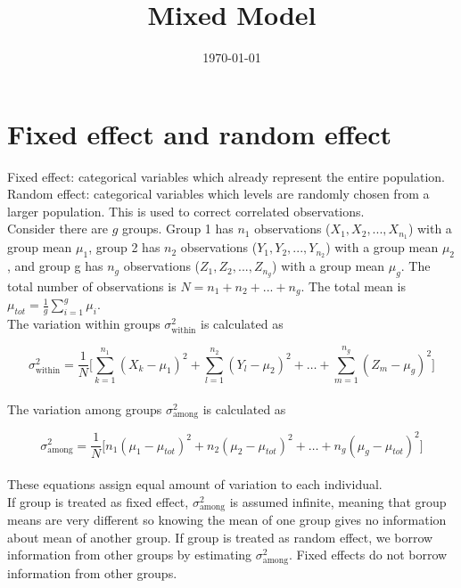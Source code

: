 \documentclass[12pt]{article}
\title{Mixed Model}
\date{\today}
\begin{document}
\maketitle

\section{Fixed effect and random effect}
Fixed effect: categorical variables which already represent the entire population. \\

Random effect: categorical variables which levels are randomly chosen from a larger population. This is used to correct correlated observations. \\

Consider there are $g$ groups. Group 1 has $n_1$ observations ($X_1, X_2, ..., X_{n_1}$) with a group mean $\mu_1$, group 2 has $n_2$ observations ($Y_1, Y_2, ..., Y_{n_2}$) with a group mean $\mu_2$, and group g has $n_g$ observations ($Z_1, Z_2, ..., Z_{n_g}$) with a group mean $\mu_g$. The total number of observations is $N = n_1 + n_2 + ... + n_g$. The total mean is $\mu_{tot}=\frac{1}{g}\sum_{i=1}^{g}\mu_i$. \\

The variation within groups $\sigma^2_{\text{within}}$ is calculated as 

$$\sigma^2_{\text{within}} = \frac{1}{N}\bigg[\sum_{k=1}^{n_1}(X_k - \mu_1)^2 + \sum_{l=1}^{n_2}(Y_l - \mu_2)^2 + \dots + \sum_{m=1}^{n_g}(Z_m - \mu_g)^2\bigg]$$\\

The variation among groups $\sigma^2_{\text{among}}$ is calculated as 

$$\sigma^2_{\text{among}} = \frac{1}{N}\bigg[n_1(\mu_1-\mu_{tot})^2 + n_2(\mu_2-\mu_{tot})^2 + \dots + n_g(\mu_g - \mu_{tot})^2\bigg]$$\\

These equations assign equal amount of variation to each individual.\\

If group is treated as fixed effect, $\sigma^2_{\text{among}}$ is assumed infinite, meaning that group means are very different so knowing the mean of one group gives no information about mean of another group. If group is treated as random effect, we borrow information from other groups by estimating $\sigma^2_{\text{among}}$. Fixed effects do not borrow information from other groups. \\
\end{document}
